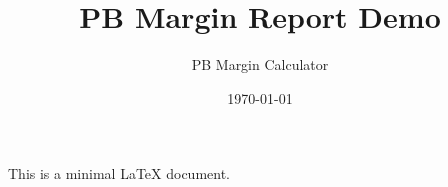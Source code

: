\documentclass{article}
\title{PB Margin Report Demo}
\author{PB Margin Calculator}
\date{\today}
\begin{document}
\maketitle

This is a minimal LaTeX document.
\end{document}
